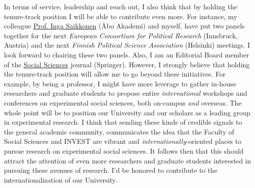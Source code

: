 \documentclass[10pt,stdletter,dateno,sigleft]{newlfm} %
\begin{document}
\begin{newlfm}
In terms of service, leadership and reach out, I also think that by holding the tenure-track position I will be able to contribute even more. For instance, my colleague \href{https://research.abo.fi/en/persons/inga-saikkonen}{Prof. Inga Saikkonen} (\AA bo Akademi) and myself, have put two panels together for the next \emph{European Consortium for Political Research} (Innsbruck, Austria) and the next \emph{Finnish Political Science Association} (Helsinki) meetings. I look forward to chairing these two panels. Also, I am an Editorial Board member of the \href{https://www.springer.com/journal/43545}{Social Sciences} journal (Springer). However, I strongly believe that holding the tenure-track position will allow me to go beyond these initiatives. For example, by being a professor, I might have more leverage to gather in-house researchers and graduate students to propose entire \emph{international} workshops and conferences on experimental social sciences, both on-campus \emph{and} overseas. The whole point will be to position our University and our scholars as a leading group in experimental research. I think that sending these kinds of credible signals to the general academic community, communicates the idea that the Faculty of Social Sciences and INVEST are vibrant and \emph{internationally}-oriented places to pursue research on experimental social sciences. It follows then that this should attract the attention of even more researchers and graduate students interested in pursuing these avenues of research. I'd be honored to contribute to the internationalization of our University.


\end{newlfm}
\end{document}
